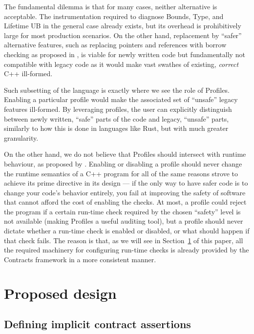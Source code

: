 The fundamental dilemma is that for many cases, neither alternative is acceptable. The instrumentation required to diagnose Bounds, Type, and Lifetime UB in the general case already exists, but its overhead is prohibitively large for most production scenarios. On the other hand, replacement by ``safer'' alternative features, such as replacing pointers and references with borrow checking as proposed in \cite{P3390R0}, is viable for newly written code but fundamentally not compatible with legacy code as it would make vast swathes of existing, \emph{correct} C++ ill-formed.

Such subsetting of the language is exactly where we see the role of Profiles. Enabling a particular profile would make the associated set of ``unsafe'' legacy features ill-formed. By leveraging profiles, the user can explicitly distinguish between newly written, ``safe'' parts of the code and legacy, ``unsafe'' parts, similarly to how this is done in languages like Rust, but with much greater granularity.

On the other hand, we do not believe that Profiles should intersect with runtime behaviour, as proposed by  \cite{P3081R1}. Enabling or disabling a profile should never change the runtime semantics of a C++ program for all of the same reasons \cite{P2900R14} strove to achieve its prime directive in its design --- if the only way to have safer code is to change your code's behavior entirely, you fail at improving the safety of software that cannot afford the cost of enabling the checks.   
At most, a profile could reject the program if a certain run-time check required by the chosen ``safety'' level is not available (making Profiles a useful auditing tool), but a profile should never dictate whether a run-time check is enabled or disabled, or what should happen if that check fails. The reason is that, as we will see in Section~\ref{design} of this paper, all the required machinery for configuring run-time checks is already provided by the Contracts framework in a more consistent manner.

\section{Proposed design}
\label{design}

\subsection{Defining implicit contract assertions}
\label{defineicas}

